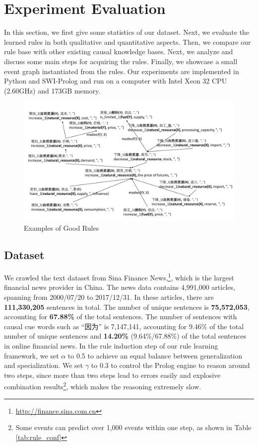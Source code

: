 \section{Experiment Evaluation}
\label{sec:experiment}
In this section, we first give some statistics of our dataset. Next, we evaluate the learned rules in both qualitative and quantitative aspects. Then, we compare our rule base with other existing causal knowledge bases. Next, we analyze and discuss some main steps for acquiring the rules. Finally, we showcase a small event graph instantiated from the rules. Our experiments are implemented in Python and SWI-Prolog and run on a computer with Intel Xeon 32 CPU (2.60GHz) and 173GB memory.

\begin{figure}[!htbp]
	\centering
	\includegraphics[width=0.95\linewidth]{figures/rule_graph}
	\caption{Examples of Good Rules}
	\label{fig:rule_graph}
\end{figure}

\subsection{Dataset}
We crawled the text dataset from Sina Finance News,\footnote{\url{ http://finance.sina.com.cn}}, which is the largest financial news provider in China. The news data contains 4,991,000 articles, spanning from 2000/07/20 to 2017/12/31.
In these articles, there are \textbf{111,330,205} sentences in total. 
The number of unique sentences is \textbf{75,572,053}, accounting for \textbf{67.88\%} of the total sentences. 
The number of sentences with causal cue words such as ``因为'' is 7,147,141, accounting for 9.46\% of the total number of unique sentences and \textbf{14.20\%} (9.64\%/67.88\%) of the total sentences in online financial news.
In the rule induction step of our rule learning framework, we set $\alpha$ to 0.5 to achieve an equal balance between generalization and specialization. 
We set $\gamma$ to 0.3 to control the Prolog engine to reason around two steps, since more than two steps lead to errors easily and explosive combination results\footnote{Some events can predict over 1,000 events within one step, as shown in Table \ref{tab:rule_conf}}, which makes the reasoning extremely slow.

